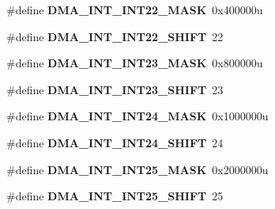\begin{DoxyCompactItemize}
\item 
\hypertarget{group___d_m_a___register___masks_ga8ce74003a24c430bd6c13eede3678c57}{}\#define {\bfseries D\+M\+A\+\_\+\+I\+N\+T\+\_\+\+I\+N\+T22\+\_\+\+M\+A\+S\+K}~0x400000u\label{group___d_m_a___register___masks_ga8ce74003a24c430bd6c13eede3678c57}

\item 
\hypertarget{group___d_m_a___register___masks_ga5c7b42f560424c7b478c9cd425a56587}{}\#define {\bfseries D\+M\+A\+\_\+\+I\+N\+T\+\_\+\+I\+N\+T22\+\_\+\+S\+H\+I\+F\+T}~22\label{group___d_m_a___register___masks_ga5c7b42f560424c7b478c9cd425a56587}

\item 
\hypertarget{group___d_m_a___register___masks_gaa911d2547c1a93dc42905a9538ae9479}{}\#define {\bfseries D\+M\+A\+\_\+\+I\+N\+T\+\_\+\+I\+N\+T23\+\_\+\+M\+A\+S\+K}~0x800000u\label{group___d_m_a___register___masks_gaa911d2547c1a93dc42905a9538ae9479}

\item 
\hypertarget{group___d_m_a___register___masks_ga4676b65bf8ef9e0066bc278d0ddf4413}{}\#define {\bfseries D\+M\+A\+\_\+\+I\+N\+T\+\_\+\+I\+N\+T23\+\_\+\+S\+H\+I\+F\+T}~23\label{group___d_m_a___register___masks_ga4676b65bf8ef9e0066bc278d0ddf4413}

\item 
\hypertarget{group___d_m_a___register___masks_gad03d48df86aa02d49ad612191cc03e9e}{}\#define {\bfseries D\+M\+A\+\_\+\+I\+N\+T\+\_\+\+I\+N\+T24\+\_\+\+M\+A\+S\+K}~0x1000000u\label{group___d_m_a___register___masks_gad03d48df86aa02d49ad612191cc03e9e}

\item 
\hypertarget{group___d_m_a___register___masks_gaec70b03f5a8a05b0513995a53ebc31a5}{}\#define {\bfseries D\+M\+A\+\_\+\+I\+N\+T\+\_\+\+I\+N\+T24\+\_\+\+S\+H\+I\+F\+T}~24\label{group___d_m_a___register___masks_gaec70b03f5a8a05b0513995a53ebc31a5}

\item 
\hypertarget{group___d_m_a___register___masks_gae9e8c0ab42f02f37c650950bc8b7cd01}{}\#define {\bfseries D\+M\+A\+\_\+\+I\+N\+T\+\_\+\+I\+N\+T25\+\_\+\+M\+A\+S\+K}~0x2000000u\label{group___d_m_a___register___masks_gae9e8c0ab42f02f37c650950bc8b7cd01}

\item 
\hypertarget{group___d_m_a___register___masks_gac8c75bfd6c0a220713a1285efa4e46d9}{}\#define {\bfseries D\+M\+A\+\_\+\+I\+N\+T\+\_\+\+I\+N\+T25\+\_\+\+S\+H\+I\+F\+T}~25\label{group___d_m_a___register___masks_gac8c75bfd6c0a220713a1285efa4e46d9}


\end{DoxyCompactItemize}

